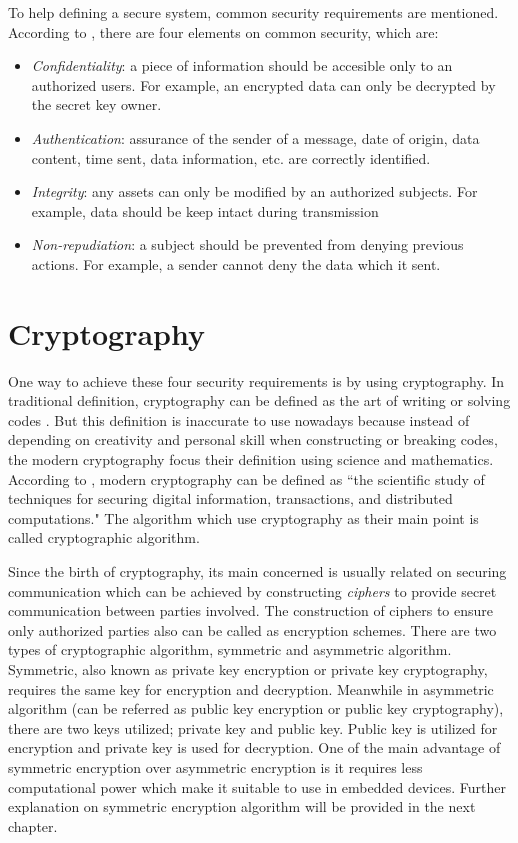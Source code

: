 To help defining a secure system, common security requirements are mentioned.
According to \cite{cryptography_decrypted}, there are four elements on common security, which are:
\begin{itemize}
  \item \textit{Confidentiality}: a piece of information should be accesible only to an authorized users. For example, an encrypted data can only be decrypted by the secret key owner.
  \item \textit{Authentication}: assurance of the sender of a message, date of origin, data content, time sent, data information, etc. are correctly identified.
  \item \textit{Integrity}: any assets can only be modified by an authorized subjects. For example, data should be keep intact during transmission
  \item \textit{Non-repudiation}: a subject should be prevented from denying previous actions. For example, a sender cannot deny the data which it sent.
\end{itemize}

\section{Cryptography}
One way to achieve these four security requirements is by using cryptography. In traditional definition, cryptography can be defined as the art of writing or solving codes \cite{Oxford_dictionary}. But this definition is inaccurate to use nowadays because instead of depending on creativity and personal skill when constructing or breaking codes, the modern cryptography focus their definition using science and mathematics. According to \cite{modern_cryptography}, modern cryptography can be defined as ``the scientific study of techniques for securing digital information, transactions, and distributed computations." The algorithm which use cryptography as their main point is called cryptographic algorithm.

Since the birth of cryptography, its main concerned is usually related on securing communication which can be achieved by constructing \textit{ciphers} to provide secret communication between parties involved. The construction of ciphers to ensure only authorized parties also can be called as encryption schemes.
There are two types of cryptographic algorithm, symmetric and asymmetric algorithm. Symmetric, also known as private key encryption or private key cryptography, requires the same key for encryption and decryption. Meanwhile in asymmetric algorithm (can be referred as public key encryption or public key cryptography), there are two keys utilized; private key and public key. Public key is utilized for encryption and private key is used for decryption. One of the main advantage of symmetric encryption over asymmetric encryption is it requires less computational power which make it suitable to use in embedded devices.
Further explanation on symmetric encryption algorithm will be provided in the next chapter.
